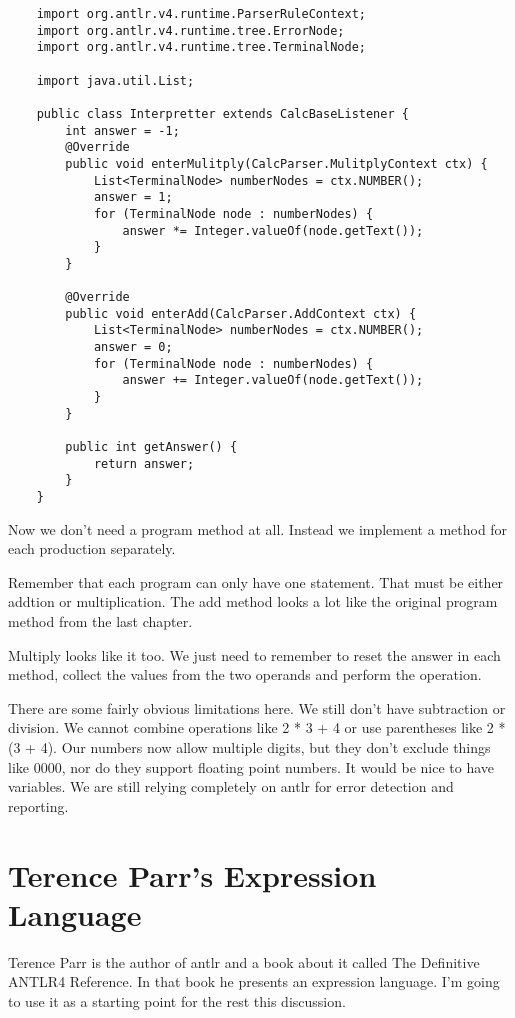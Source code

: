 {\footnotesize
\begin{verbatim}
    import org.antlr.v4.runtime.ParserRuleContext;
    import org.antlr.v4.runtime.tree.ErrorNode;
    import org.antlr.v4.runtime.tree.TerminalNode;
    
    import java.util.List;
    
    public class Interpretter extends CalcBaseListener {
        int answer = -1;
    	@Override
        public void enterMulitply(CalcParser.MulitplyContext ctx) {
            List<TerminalNode> numberNodes = ctx.NUMBER();
            answer = 1;
            for (TerminalNode node : numberNodes) {
                answer *= Integer.valueOf(node.getText());
            }
        }
    
    	@Override
        public void enterAdd(CalcParser.AddContext ctx) {
            List<TerminalNode> numberNodes = ctx.NUMBER();
            answer = 0;
            for (TerminalNode node : numberNodes) {
                answer += Integer.valueOf(node.getText());
            }
        }
    
        public int getAnswer() {
            return answer;
        }
    }
\end{verbatim}
}

Now we don't need a program method at all. Instead we implement a method for
each production separately.

Remember that each program can only have one statement. That must be
either addtion or multiplication. The add method looks a lot like the
original program method from the last chapter.

Multiply looks like it too. We just need to remember to reset the
answer in each method, collect the values from the two operands
and perform the operation.

There are some fairly obvious limitations here. We still don't have
subtraction or division. We cannot combine operations like 2 * 3 + 4
or use parentheses like 2 * (3 + 4). Our numbers now allow multiple
digits, but they don't exclude things like 0000, nor do they support
floating point numbers. It would be nice to have variables.
We are still relying completely on antlr for error detection and reporting.

\section{Terence Parr's Expression Language}

Terence Parr is the author of antlr and a book about it called
The Definitive ANTLR4 Reference. In that book he presents an expression
language. I'm going to use it as a starting point for the rest this
discussion.

